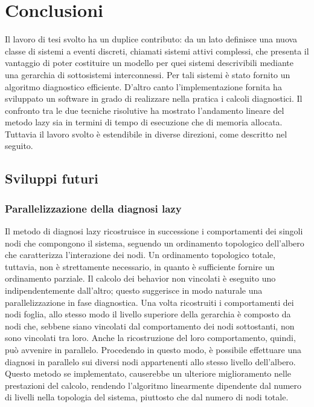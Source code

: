 \chapter{Conclusioni}
Il lavoro di tesi svolto ha un duplice contributo: da un lato definisce una nuova classe di sistemi a eventi discreti, chiamati sistemi attivi complessi, che presenta il vantaggio di poter costituire un modello per quei sistemi descrivibili mediante una gerarchia di sottosistemi interconnessi. Per tali sistemi è stato fornito un algoritmo diagnostico efficiente. D'altro canto l'implementazione fornita ha sviluppato un software in grado di realizzare nella pratica i calcoli diagnostici. Il confronto tra le due tecniche risolutive ha mostrato l'andamento lineare del metodo lazy sia in termini di tempo di esecuzione che di memoria allocata. Tuttavia il lavoro svolto è estendibile in diverse direzioni, come descritto nel seguito.

\newpage
\section{Sviluppi futuri}

\subsection{Parallelizzazione della diagnosi lazy}
Il metodo di diagnosi lazy ricostruisce in successione i comportamenti dei singoli nodi che compongono il sistema, seguendo un ordinamento topologico dell'albero che caratterizza l'interazione dei nodi. Un ordinamento topologico totale, tuttavia, non è strettamente necessario, in quanto è sufficiente fornire un ordinamento parziale. Il calcolo dei behavior non vincolati è eseguito uno indipendentemente dall'altro; questo suggerisce in modo naturale una parallelizzazione in fase diagnostica. Una volta ricostruiti i comportamenti dei nodi foglia, allo stesso modo il livello superiore della gerarchia è composto da nodi che, sebbene siano vincolati dal comportamento dei nodi sottostanti, non sono vincolati tra loro. Anche la ricostruzione del loro comportamento, quindi, può avvenire in parallelo. Procedendo in questo modo, è possibile effettuare una diagnosi in parallelo sui diversi nodi appartenenti allo stesso livello dell'albero. Questo metodo se implementato, causerebbe un ulteriore miglioramento nelle prestazioni del calcolo, rendendo l'algoritmo linearmente dipendente dal numero di livelli nella topologia del sistema, piuttosto che dal numero di nodi totale. 


